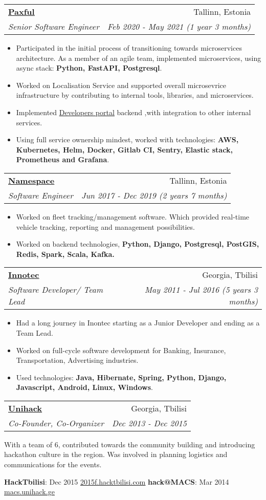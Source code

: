 \documentclass[letterpaper,11pt]{article}
\makeatletter
\newcommand{\resumeItem}[1]{
  \item\small{
    #1 \vspace{-2pt}
  }
}
\newcommand{\resumeSubheading}[4]{
  \vspace{-1pt}\item
    \begin{tabular*}{0.97\textwidth}{l@{\extracolsep{\fill}}r}
      \textbf{#1} & #2 \\
      \textit{\small#3} & \textit{\small #4} \\
    \end{tabular*}\vspace{-5pt}
}
\newcommand{\link}[2]{\href{#1}{\underline{#2}}}
\newcommand{\resumeItemListStart}{\begin{itemize}}
\newcommand{\resumeItemListEnd}{\end{itemize}\vspace{-5pt}}
\makeatother
\begin{document}
\resumeSubheading
      {\link{https://paxful.com}{Paxful}}{Tallinn, Estonia}
      {Senior Software Engineer}{Feb 2020 - May 2021 (1 year 3 months)}
      \resumeItemListStart
	   \resumeItem{Participated in the initial process of transitioning towards microservices architecture. As a member of an agile team, implemented microservices, using async stack: \textbf{Python, FastAPI, Postgresql}.}
        \resumeItem{Worked on Localisation Service and supported overall microsevrice infrastructure by contributing to internal tools, libraries, and microservices.}
        \resumeItem{Implemented \link{https://developers.paxful.com/}{Developers portal} backend ,with integration to other internal services.}
        \resumeItem{Using full service ownership mindest, worked with technologies: \textbf{AWS, Kubernetes, Helm, Docker, Gitlab CI, Sentry, Elastic stack, Prometheus and Grafana}.}
      \resumeItemListEnd
	
    \resumeSubheading
      {\link{https://namespace.ee}{Namespace}}{Tallinn, Estonia}
      {Software Engineer}{Jun 2017 - Dec 2019 (2 years 7 months)}
      \resumeItemListStart
        \resumeItem{Worked on fleet tracking/management software. Which provided real-time vehicle tracking, reporting and management possibilities.}
		\resumeItem{Worked on backend technologies, \textbf{Python, Django, Postgresql, PostGIS, Redis, Spark, Scala, Kafka.}}
      \resumeItemListEnd

    \resumeSubheading
      {\href{http://innotec.ge/}{\underline{Innotec}}}{Georgia, Tbilisi}
      {Software Developer/ Team Lead}{May 2011 - Jul 2016 (5 years 3 months)}
      \resumeItemListStart
        \resumeItem{Had a long journey in Inontec starting as a Junior Developer and ending as a Team Lead.}
        \resumeItem{Worked on full-cycle software development for Banking, Insurance, Transportation, Advertising industries.}
        \resumeItem{Used technologies: \textbf{Java, Hibernate, Spring, Python, Django, Javascript, Android, Linux, Windows}.}
      \resumeItemListEnd
      
     \resumeSubheading
      {\href{https://www.facebook.com/unihackge/}{\underline{Unihack}}}{Georgia, Tbilisi}
      {Co-Founder, Co-Organizer}{Dec 2013 - Dec 2015}

		With a team of 6, contributed towards the community building and introducing hackathon culture in the region. Was involved in planning logistics and communications for the events.

     \textbf{HackTbilisi}{: Dec 2015 \link{https://www.facebook.com/events/684989148311419/}{2015f.hacktbilisi.com}}
     \hfill
     \textbf{hack@MACS}{: Mar 2014 \link{https://www.facebook.com/events/449121528548787/}{macs.unihack.ge}}
     
\end{document}
